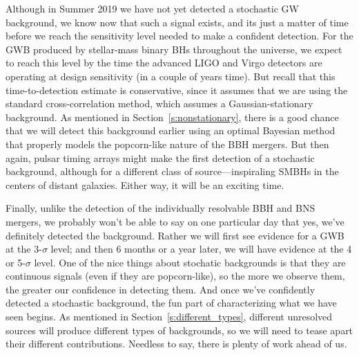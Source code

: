 Although in Summer 2019 we have not yet detected a stochastic
GW background, we know now that such a signal exists, 
and its just a matter of time 
before we reach the sensitivity level needed to make a confident 
detection.
For the GWB produced by stellar-mass binary BHs throughout 
the universe, we expect to reach this level
by the time the advanced LIGO and Virgo detectors are operating
at design sensitivity (in a couple of years time).
But recall that this time-to-detection estimate is 
conservative, since it assumes that we are using the standard 
cross-correlation method, which assumes a Gaussian-stationary
background.
As mentioned in Section~\ref{s:nonstationary}, there is a good 
chance that we will detect this background earlier using an 
optimal Bayesian method that properly models the popcorn-like 
nature of the BBH mergers.
But then again, pulsar timing arrays might make the first detection 
of a stochastic background, although for a different class of
source---inspiraling SMBHs in the centers of distant galaxies.
Either way, it will be an exciting time.

Finally, unlike the detection of the individually resolvable
BBH and BNS mergers, we probably
won't be able to say on one particular day that yes, we've 
definitely detected the background.
Rather we will first see evidence for a GWB at the 
3-$\sigma$ level; and 
then 6 months or a year later, we will have evidence at the 
4 or 5-$\sigma$ level.
One of the nice things about stochatic backgrounds is that
they are continuous signals (even if they are popcorn-like), 
so the more we observe them, the greater our confidence in
detecting them.
And once we've confidently detected a stochastic background, 
the fun part of characterizing what we have seen begins.
As mentioned in Section~\ref{s:different_types}, different 
unresolved sources will produce different types of backgrounds,
so we will need to tease apart their different contributions.
Needless to say, there is plenty of work ahead of us.
 
